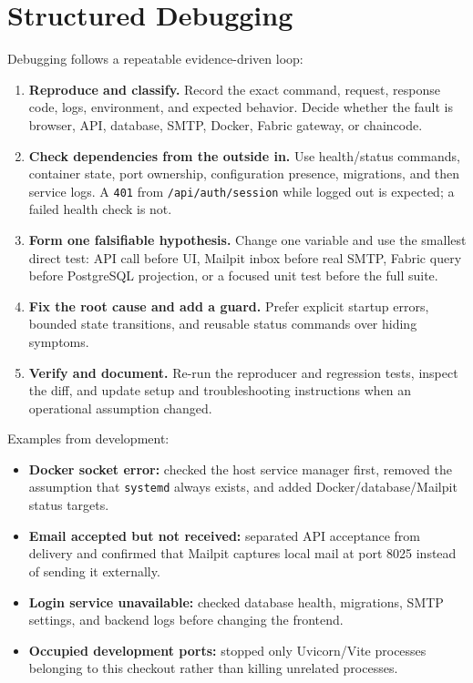\documentclass[10pt,a4paper]{article}
\begin{document}
\newpage
\section{Structured Debugging}

Debugging follows a repeatable evidence-driven loop:

\begin{enumerate}
  \item \textbf{Reproduce and classify.} Record the exact command, request, response code, logs, environment, and expected behavior. Decide whether the fault is browser, API, database, SMTP, Docker, Fabric gateway, or chaincode.
  \item \textbf{Check dependencies from the outside in.} Use health/status commands, container state, port ownership, configuration presence, migrations, and then service logs. A \texttt{401} from \texttt{/api/auth/session} while logged out is expected; a failed health check is not.
  \item \textbf{Form one falsifiable hypothesis.} Change one variable and use the smallest direct test: API call before UI, Mailpit inbox before real SMTP, Fabric query before PostgreSQL projection, or a focused unit test before the full suite.
  \item \textbf{Fix the root cause and add a guard.} Prefer explicit startup errors, bounded state transitions, and reusable status commands over hiding symptoms.
  \item \textbf{Verify and document.} Re-run the reproducer and regression tests, inspect the diff, and update setup and troubleshooting instructions when an operational assumption changed.
\end{enumerate}

Examples from development:

\begin{itemize}
  \item \textbf{Docker socket error:} checked the host service manager first, removed the assumption that \texttt{systemd} always exists, and added Docker/database/Mailpit status targets.
  \item \textbf{Email accepted but not received:} separated API acceptance from delivery and confirmed that Mailpit captures local mail at port 8025 instead of sending it externally.
  \item \textbf{Login service unavailable:} checked database health, migrations, SMTP settings, and backend logs before changing the frontend.
  \item \textbf{Occupied development ports:} stopped only Uvicorn/Vite processes belonging to this checkout rather than killing unrelated processes.
\end{itemize}
\end{document}
